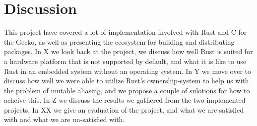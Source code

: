 
\chapter{Discussion}
\label{chap:discussion}

This project have covered a lot of implementation involved with Rust and C for the Gecko, as well as presenting the ecosystem for building and distributing packages.
In X we look back at the project, we discuss how well Rust is suited for a hardware platform that is not supported by default, and what it is like to use Rust in an embedded system without an operating system.
In Y we move over to discuss how well we were able to utilize Rust's ownership-system to help us with the problem of mutable aliasing, and we propose a couple of sulotions for how to acheive this.
In Z we discuss the results we gathered from the two implemented projects.
In XX we give an evaluation of the project, and what we are satisfied with and what we are un-satisfied with.





%
